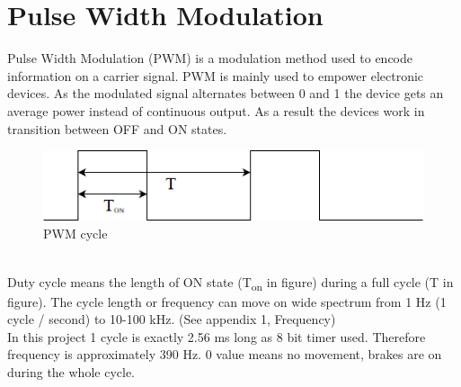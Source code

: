 \documentclass[11pt,a4paper,oneside,article]{memoir}
\begin{document}
\section{Pulse Width Modulation}
Pulse Width Modulation (PWM) is a modulation method used to encode information on a carrier signal. PWM is mainly used to empower electronic devices. As the modulated signal alternates between 0 and 1 the device gets an average power instead of continuous output. As a result the devices work in transition between OFF and ON states.\\
\begin{figure}[h]
	\centering
	\includegraphics[width=12cm]{illustration/About_PWM}
	\caption[]{PWM cycle}
	\label{fig:aboutpwm}
\end{figure}
\\
Duty cycle means the length of ON state (T\textsubscript{on} in figure) during a full cycle (T in figure). The cycle length or frequency can move on wide spectrum from 1 Hz (1 cycle / second) to 10-100 kHz. (See appendix 1, Frequency)\\
In this project 1 cycle is exactly 2.56 ms long as 8 bit timer used. Therefore frequency is approximately 390 Hz. 0 value means no movement, brakes are on during the whole cycle.
\cite{wikipedia:PWM}
\end{document}
